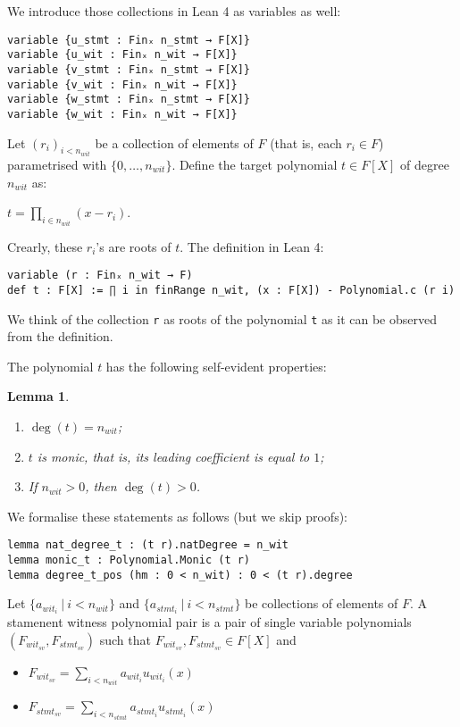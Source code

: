 \documentclass{article}
\newtheorem{lemma}{Lemma}
\theoremstyle{definition}
\theoremstyle{remark}
\begin{document}
We introduce those collections in Lean 4 as variables as well:

\begin{lstlisting}
variable {u_stmt : Finₓ n_stmt → F[X]}
variable {u_wit : Finₓ n_wit → F[X]}
variable {v_stmt : Finₓ n_stmt → F[X]}
variable {v_wit : Finₓ n_wit → F[X]}
variable {w_stmt : Finₓ n_stmt → F[X]}
variable {w_wit : Finₓ n_wit → F[X]}
\end{lstlisting}

Let $(r_i)_{i < n_{wit}}$ be a collection of elements of $F$ (that is, each $r_i \in F$) parametrised with $\{0, \dots, n_{wit} \}$.
Define the target polynomial $t \in F[X]$ of degree $n_{wit}$ as:
\begin{center}
$t = \prod \limits_{i \in n_{wit}} (x - r_i)$.
\end{center}

Crearly, these $r_i$'s are roots of $t$. The definition in Lean 4:
\begin{lstlisting}
variable (r : Finₓ n_wit → F)
def t : F[X] := ∏ i in finRange n_wit, (x : F[X]) - Polynomial.c (r i)
\end{lstlisting}

We think of the collection \verb"r" as roots of the polynomial \verb"t" as it can be observed from the definition.

The polynomial $t$ has the following self-evident properties:

\begin{lemma}
$ $

\begin{enumerate}
\item $\deg(t) = n_{wit}$;
\item $t$ is monic, that is, its leading coefficient is equal to $1$;
\item If $n_{wit} > 0$, then $\deg(t) > 0$.
\end{enumerate}
\end{lemma}

We formalise these statements as follows (but we skip proofs):
\begin{lstlisting}
lemma nat_degree_t : (t r).natDegree = n_wit
lemma monic_t : Polynomial.Monic (t r)
lemma degree_t_pos (hm : 0 < n_wit) : 0 < (t r).degree
\end{lstlisting}

Let $\{ a_{{wit}_i} \: | \: i < n_{wit}\}$ and $\{ a_{{stmt}_i} \: | \: i < n_{stmt} \}$ be collections of elements of $F$.
A stamenent witness polynomial pair is a pair of single variable polynomials $(F_{{wit}_{sv}}, F_{{stmt}_{sv}})$
such that $F_{{wit}_{sv}}, F_{{stmt}_{sv}} \in F[X]$ and
\begin{itemize}
\item $F_{{wit}_{sv}} = \sum \limits_{i < n_{wit}} a_{{wit}_i} u_{{wit}_{i}}(x)$
\item $F_{{stmt}_{sv}} = \sum \limits_{i < n_{stmt}} a_{{stmt}_i} u_{{stmt}_{i}}(x)$
\end{itemize}
\end{document}
